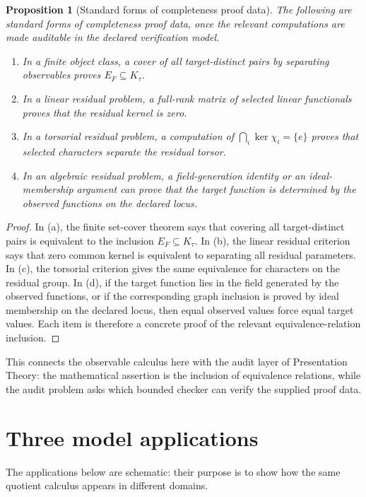 \documentclass[11pt]{article}
\newtheorem{proposition}[theorem]{Proposition}
\theoremstyle{definition}
\theoremstyle{remark}
\begin{document}
\begin{proposition}[Standard forms of completeness proof data]
The following are standard forms of completeness proof data, once the relevant computations are made auditable in the declared verification model.
\begin{enumerate}[label=(\alph*)]
\item In a finite object class, a cover of all target-distinct pairs by separating observables proves \(E_F\subseteq K_\tau\).
\item In a linear residual problem, a full-rank matrix of selected linear functionals proves that the residual kernel is zero.
\item In a torsorial residual problem, a computation of \(\bigcap_i\ker\chi_i=\{e\}\) proves that selected characters separate the residual torsor.
\item In an algebraic residual problem, a field-generation identity or an ideal-membership argument can prove that the target function is determined by the observed functions on the declared locus.
\end{enumerate}
\end{proposition}

\begin{proof}
In (a), the finite set-cover theorem says that covering all target-distinct pairs is equivalent to the inclusion \(E_F\subseteq K_\tau\).  In (b), the linear residual criterion says that zero common kernel is equivalent to separating all residual parameters.  In (c), the torsorial criterion gives the same equivalence for characters on the residual group.  In (d), if the target function lies in the field generated by the observed functions, or if the corresponding graph inclusion is proved by ideal membership on the declared locus, then equal observed values force equal target values.  Each item is therefore a concrete proof of the relevant equivalence-relation inclusion.
\end{proof}

This connects the observable calculus here with the audit layer of Presentation Theory: the mathematical assertion is the inclusion of equivalence relations, while the audit problem asks which bounded checker can verify the supplied proof data.

\section{Three model applications}

The applications below are schematic: their purpose is to show how the same quotient calculus appears in different domains.
\end{document}

